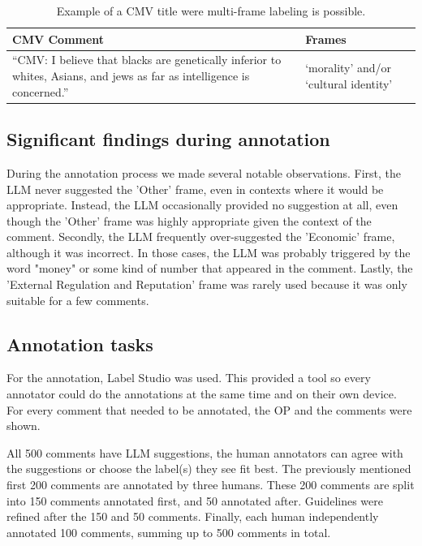 \documentclass[
10pt, %
a4paper, %
oneside, %
headinclude,footinclude, %
] {book}%
\begin{document}
\begin{table}
\small
    \centering
    \renewcommand{\arraystretch}{1.4}
    \begin{tabular}{|>{\raggedright\arraybackslash}p{9cm}|>{\raggedright\arraybackslash}p{4cm}|}\hline
        \textbf{CMV Comment} & \textbf{Frames} \\\hline
        “CMV: I believe that blacks are genetically inferior to whites, Asians, and jews as far as intelligence is concerned.” & ‘morality’ and/or ‘cultural identity’\\ \hline
    \end{tabular}
    \caption{Example of a CMV title were multi-frame labeling is possible.}
    \label{tab:multiframe_example}
\end{table}

\subsection{Significant findings during annotation}
During the annotation process we made several notable observations. First, the LLM never suggested the 'Other' frame, even in contexts where it would be appropriate. Instead, the LLM occasionally provided no suggestion at all, even though the 'Other' frame was highly appropriate given the context of the comment. Secondly, the LLM frequently over-suggested the 'Economic' frame, although it was incorrect. In those cases, the LLM was probably triggered by the word "money" or some kind of number that appeared in the comment. Lastly, the 'External Regulation and Reputation' frame was rarely used because it was only suitable for a few comments.

\subsection{Annotation tasks}
For the annotation, Label Studio was used. This provided a tool so every annotator could do the annotations at the same time and on their own device. For every comment that needed to be annotated, the OP and the comments were shown.

All 500 comments have LLM suggestions, the human annotators can agree with the suggestions or choose the label(s) they see fit best. The previously mentioned first 200 comments are annotated by three humans. These 200 comments are split into 150 comments annotated first, and 50 annotated after. Guidelines were refined after the 150 and 50 comments. Finally, each human independently annotated 100 comments, summing up to 500 comments in total.
\end{document}
